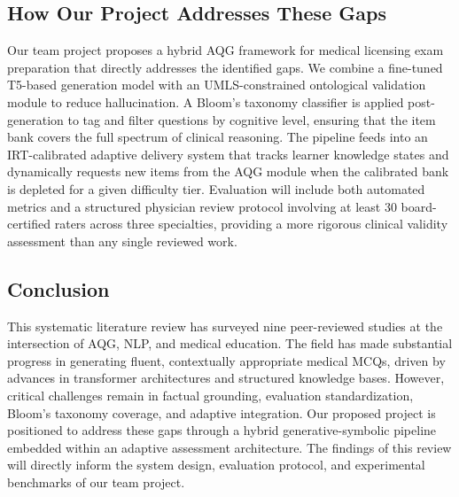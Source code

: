 \documentclass[conference]{IEEEtran}
\begin{document}
\subsection{How Our Project Addresses These Gaps}

Our team project proposes a hybrid AQG framework for medical licensing exam preparation that directly addresses the identified gaps. We combine a fine-tuned T5-based generation model with an UMLS-constrained ontological validation module to reduce hallucination. A Bloom's taxonomy classifier is applied post-generation to tag and filter questions by cognitive level, ensuring that the item bank covers the full spectrum of clinical reasoning. The pipeline feeds into an IRT-calibrated adaptive delivery system that tracks learner knowledge states and dynamically requests new items from the AQG module when the calibrated bank is depleted for a given difficulty tier. Evaluation will include both automated metrics and a structured physician review protocol involving at least 30 board-certified raters across three specialties, providing a more rigorous clinical validity assessment than any single reviewed work.

\subsection{Conclusion}

This systematic literature review has surveyed nine peer-reviewed studies at the intersection of AQG, NLP, and medical education. The field has made substantial progress in generating fluent, contextually appropriate medical MCQs, driven by advances in transformer architectures and structured knowledge bases. However, critical challenges remain in factual grounding, evaluation standardization, Bloom's taxonomy coverage, and adaptive integration. Our proposed project is positioned to address these gaps through a hybrid generative-symbolic pipeline embedded within an adaptive assessment architecture. The findings of this review will directly inform the system design, evaluation protocol, and experimental benchmarks of our team project.



\end{document}
